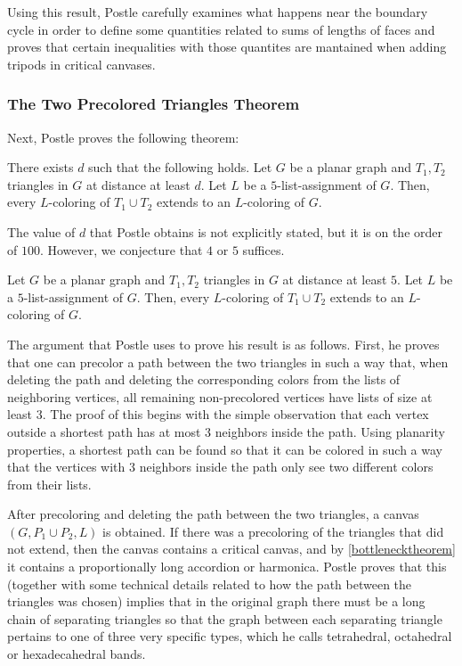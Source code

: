 
Using this result, Postle carefully examines what happens near the boundary cycle in order to define some quantities related to sums of lengths of faces and proves that certain inequalities with those quantites are mantained when adding tripods in critical canvases. 



\subsubsection{The Two Precolored Triangles Theorem}

Next, Postle proves the following theorem:

\begin{theorem}
	There exists $d$ such that the following holds.
	Let $G$ be a planar graph and $T_1, T_2$ triangles in $G$ at distance at least $d$. Let $L$ be a $5$-list-assignment of $G$. Then, every $L$-coloring of $T_1 \cup T_2$ extends to an $L$-coloring of $G$.
\end{theorem}

The value of $d$ that Postle obtains is not explicitly stated, but it is on the order of $100$. However, we conjecture that $4$ or $5$ suffices.

\begin{conjecture}
Let $G$ be a planar graph and $T_1, T_2$ triangles in $G$ at distance at least $5$. Let $L$ be a $5$-list-assignment of $G$. Then, every $L$-coloring of $T_1 \cup T_2$ extends to an $L$-coloring of $G$.
\end{conjecture}

The argument that Postle uses to prove his result is as follows. First, he proves that one can precolor a path between the two triangles in such a way that, when deleting the path and deleting the corresponding colors from the lists of neighboring vertices, all remaining non-precolored vertices have lists of size at least $3$. The proof of this begins with the simple observation that each vertex outside a shortest path has at most $3$ neighbors inside the path. Using planarity properties, a shortest path can be found so that it can be colored in such a way that the vertices with $3$ neighbors inside the path only see two different colors from their lists.

After precoloring and deleting the path between the two triangles, a canvas $(G, P_1 \cup P_2, L)$ is obtained. If there was a precoloring of the triangles that did not extend, then the canvas contains a critical canvas, and by \ref{bottlenecktheorem} it contains a proportionally long accordion or harmonica. Postle proves that this (together with some technical details related to how the path between the triangles was chosen) implies that in the original graph there must be a long chain of separating triangles so that the graph between each separating triangle pertains to one of three very specific types, which he calls tetrahedral, octahedral or hexadecahedral bands. 

